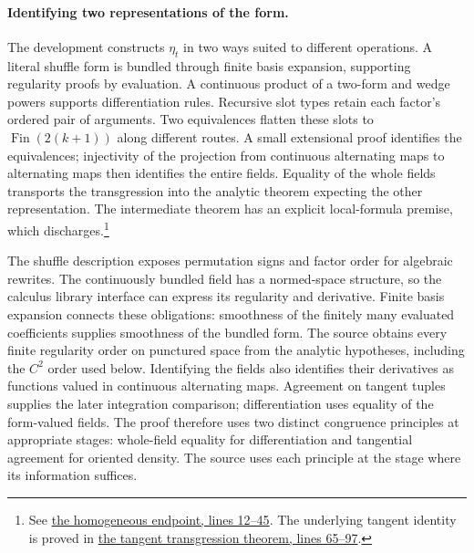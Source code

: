 \paragraph{Identifying two representations of the form.}
The development constructs $\eta_t$ in two ways suited to different operations. A literal shuffle form is bundled through finite basis expansion, supporting regularity proofs by evaluation. A continuous product of a two-form and wedge powers supports differentiation rules. Recursive slot types retain each factor's ordered
pair of arguments. Two equivalences flatten these slots to
$\operatorname{Fin}(2(k+1))$ along different routes. A small extensional proof
identifies the equivalences; injectivity of the projection from continuous
alternating maps to alternating maps then identifies the entire fields.
Equality of the whole fields transports the transgression into the analytic theorem expecting the other representation. The intermediate theorem
 has an explicit local-formula
premise, which  discharges.\footnote{See
\href{https://github.com/openai/math/blob/fd4aeeb2ee4fc729c18d98444fed42fd0529eeeb/lean/OAI/Analysis/Mahler/HomogeneousEndpoint.lean\#L12-L45}{the homogeneous endpoint, lines 12--45}.
The underlying tangent identity is proved in
\href{https://github.com/openai/math/blob/fd4aeeb2ee4fc729c18d98444fed42fd0529eeeb/lean/OAI/Analysis/Mahler/HomogeneousTransgression.lean\#L65-L97}{the tangent transgression theorem, lines 65--97}.}

The shuffle description exposes permutation signs and factor order for algebraic rewrites. The continuously bundled field has a normed-space structure, so the calculus library interface can express its regularity and derivative.
Finite basis expansion connects these obligations: smoothness of the finitely
many evaluated coefficients supplies smoothness of the bundled form.
The source obtains every finite regularity order on punctured space from the
analytic hypotheses, including the $C^2$ order used below.
Identifying the fields also identifies their derivatives as functions valued
in continuous alternating maps. Agreement on tangent tuples supplies the later integration comparison; differentiation uses equality of the form-valued fields. The proof therefore uses two distinct congruence principles at
appropriate stages: whole-field equality for differentiation and tangential
agreement for oriented density. The source uses each principle at the stage where its information suffices.

